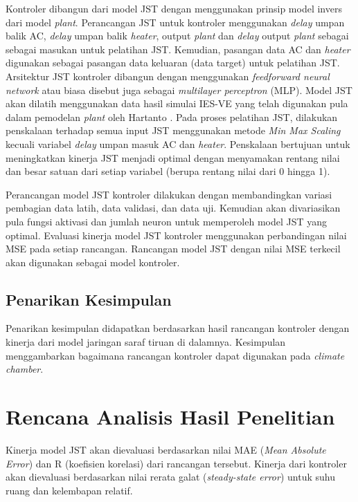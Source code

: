 Kontroler dibangun dari model JST dengan menggunakan prinsip model invers dari model \textit{plant}. Perancangan JST untuk kontroler menggunakan \textit{delay} umpan balik AC, \textit{delay} umpan balik \textit{heater}, output \textit{plant} dan \textit{delay} output \textit{plant} sebagai sebagai masukan untuk pelatihan JST. Kemudian, pasangan data AC dan \textit{heater} digunakan sebagai pasangan data keluaran (data target) untuk pelatihan JST. Arsitektur JST kontroler dibangun dengan menggunakan \textit{feedforward neural network} atau biasa disebut juga sebagai \textit{multilayer perceptron} (MLP). Model JST akan dilatih menggunakan data hasil simulai IES-VE yang telah digunakan pula dalam pemodelan \textit{plant} oleh Hartanto \cite{skripsiTanto}. Pada proses pelatihan JST, dilakukan penskalaan terhadap semua input JST menggunakan metode \textit{Min Max Scaling} kecuali variabel \textit{delay} umpan masuk AC dan \textit{heater}. Penskalaan bertujuan untuk meningkatkan kinerja JST menjadi optimal dengan menyamakan rentang nilai dan besar satuan dari setiap variabel (berupa rentang nilai dari 0 hingga 1).

Perancangan model JST kontroler dilakukan dengan membandingkan variasi pembagian data latih, data validasi, dan data uji. Kemudian akan divariasikan pula fungsi aktivasi dan jumlah neuron untuk memperoleh model JST yang optimal. Evaluasi kinerja model JST kontroler menggunakan perbandingan nilai MSE pada setiap rancangan. Rancangan model JST dengan nilai MSE terkecil akan digunakan sebagai model kontroler.

\subsection{Penarikan Kesimpulan}
Penarikan kesimpulan didapatkan berdasarkan hasil rancangan kontroler dengan kinerja dari model jaringan saraf tiruan di dalamnya. Kesimpulan menggambarkan bagaimana rancangan kontroler dapat digunakan pada \textit{climate chamber}.

\section{Rencana Analisis Hasil Penelitian}
Kinerja model JST akan dievaluasi berdasarkan nilai MAE (\textit{Mean Absolute Error}) dan R (koefisien korelasi) dari rancangan tersebut. Kinerja dari kontroler akan dievaluasi berdasarkan nilai rerata galat (\textit{steady-state error}) untuk suhu ruang dan kelembapan relatif.